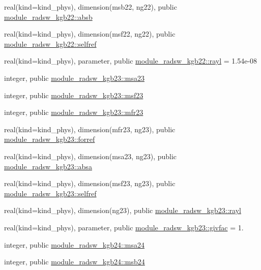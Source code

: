 \begin{DoxyCompactItemize}
\item 
real(kind=kind\+\_\+phys), dimension(msb22, ng22), public \hyperlink{group__module__radsw__main_ga60403e7d343c85e965f3507b0db0f2a5}{module\+\_\+radsw\+\_\+kgb22\+::absb}
\item 
real(kind=kind\+\_\+phys), dimension(msf22, ng22), public \hyperlink{group__module__radsw__main_gabc3bd99e8ad7d1f09fb7fab7ed67a32b}{module\+\_\+radsw\+\_\+kgb22\+::selfref}
\item 
real(kind=kind\+\_\+phys), parameter, public \hyperlink{group__module__radsw__main_gae77b766677ea476e2ba14b88e511870a}{module\+\_\+radsw\+\_\+kgb22\+::rayl} = 1.\+54e-\/08
\item 
integer, public \hyperlink{namespacemodule__radsw__kgb23_a744e7ef73b8d3cc01ff9c6a6010d95d7}{module\+\_\+radsw\+\_\+kgb23\+::msa23}
\item 
integer, public \hyperlink{group__module__radsw__main_gab96959c26232963a568609451483843e}{module\+\_\+radsw\+\_\+kgb23\+::msf23}
\item 
integer, public \hyperlink{group__module__radsw__main_ga78b43ec4bc2afd4f520480a8410d9df5}{module\+\_\+radsw\+\_\+kgb23\+::mfr23}
\item 
real(kind=kind\+\_\+phys), dimension(mfr23, ng23), public \hyperlink{group__module__radsw__main_ga18fabad311919ee30b2d367fbe250bcc}{module\+\_\+radsw\+\_\+kgb23\+::forref}
\item 
real(kind=kind\+\_\+phys), dimension(msa23, ng23), public \hyperlink{group__module__radsw__main_ga2541e41c7d445a2ce73283e2fb76270c}{module\+\_\+radsw\+\_\+kgb23\+::absa}
\item 
real(kind=kind\+\_\+phys), dimension(msf23, ng23), public \hyperlink{group__module__radsw__main_gae4e51bcb3c3cbaaf1476d5ab18b072e5}{module\+\_\+radsw\+\_\+kgb23\+::selfref}
\item 
real(kind=kind\+\_\+phys), dimension(ng23), public \hyperlink{group__module__radsw__main_ga40006f284543c7347eced417b9de2fc6}{module\+\_\+radsw\+\_\+kgb23\+::rayl}
\item 
real(kind=kind\+\_\+phys), parameter, public \hyperlink{group__module__radsw__main_ga5f6ced06169db4b7470e20d5639ac54c}{module\+\_\+radsw\+\_\+kgb23\+::givfac} = 1.
\item 
integer, public \hyperlink{namespacemodule__radsw__kgb24_ad416df05aed8a6ae1ecd57d5c90c223c}{module\+\_\+radsw\+\_\+kgb24\+::msa24}
\item 
integer, public \hyperlink{group__module__radsw__main_ga0ec09b4df9fbfa868844ad93a84cbe31}{module\+\_\+radsw\+\_\+kgb24\+::msb24}

\end{DoxyCompactItemize}
